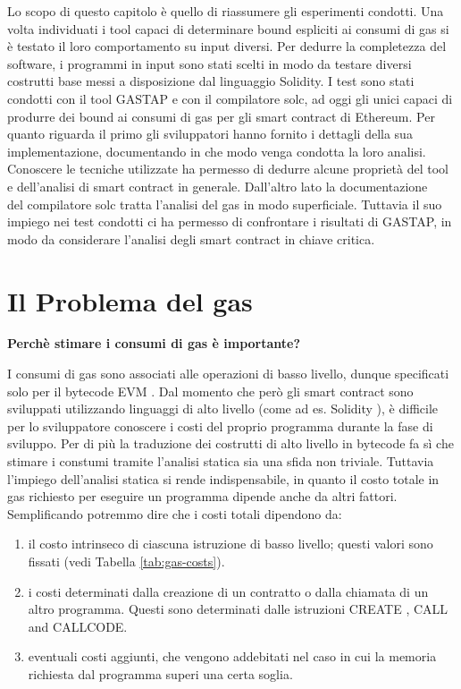 
Lo scopo di questo capitolo è quello di riassumere gli esperimenti condotti.\newline
\indent Una volta individuati i tool capaci di determinare bound espliciti ai consumi di gas si è testato il loro comportamento su input diversi. Per dedurre la completezza del software, i programmi in input sono stati scelti in modo da testare diversi costrutti base messi a disposizione dal linguaggio Solidity.\newline
\indent I test sono stati condotti con il tool GASTAP e con il compilatore solc, ad oggi gli unici capaci di produrre dei bound ai consumi di gas per gli smart contract di Ethereum. Per quanto riguarda il primo gli sviluppatori hanno fornito i dettagli della sua implementazione, documentando in che modo venga condotta la loro analisi. Conoscere le tecniche utilizzate ha permesso di dedurre alcune proprietà del tool e dell'analisi di smart contract in generale. Dall'altro lato la documentazione ~\cite{solidity-docs} del compilatore solc tratta l'analisi del gas in modo superficiale. Tuttavia il suo impiego nei test condotti ci ha permesso di confrontare i risultati di GASTAP, in modo da considerare l'analisi degli smart contract in chiave critica.\newline

\newpage

\section{Il Problema del gas}

	\textbf{Perchè stimare i consumi di gas è importante?}

	\indent I consumi di gas sono associati alle operazioni di basso livello, 
	dunque specificati solo per il bytecode EVM \cite{wood2014ethereum}. Dal momento che però gli
	smart contract sono sviluppati utilizzando linguaggi di alto livello (come
	ad es. Solidity \cite{ethereum/solidity_2019}), è difficile per lo sviluppatore conoscere i 
	costi del proprio programma durante la fase di sviluppo. Per di più la traduzione 
	dei costrutti di alto livello in bytecode fa sì che stimare i constumi tramite l'analisi 
	statica sia una sfida non triviale. Tuttavia l'impiego dell'analisi statica si rende indispensabile, in quanto il costo totale in gas richiesto per eseguire un programma dipende anche da altri fattori.\newline
	\indent Semplificando potremmo dire che i costi totali dipendono da:
	\begin{enumerate}
	\item il costo intrinseco di ciascuna istruzione di basso livello; questi valori sono fissati (vedi Tabella \ref{tab:gas-costs}).
	\item i costi determinati dalla creazione di un contratto o dalla chiamata di un altro programma. Questi sono determinati dalle istruzioni CREATE , CALL and CALLCODE.
	\item eventuali costi aggiunti, che vengono addebitati nel caso in cui la memoria richiesta dal programma superi una certa soglia.
	\end{enumerate}

